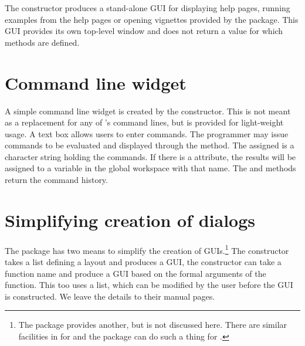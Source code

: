The  constructor produces a stand-alone
GUI for displaying help pages, running examples from the help pages or
opening vignettes provided by the package. This GUI provides its own
top-level window and does not return a value for which methods are defined.


\section{Command line widget}
\label{sec:gWidgets-command-line-widget}



A simple command line widget is created by the
 constructor. This is not meant as a
replacement for any of \R's command lines, but is provided for
light-weight usage. A text box allows users to enter \R\/
commands. The programmer may issue commands to be evaluated and
displayed through the  method. The
 assigned is a character string holding the commands. If
there is a  attribute, the results will be assigned to a variable
in the global workspace with that name. The  and \code{[}
methods return the command history.

\section{Simplifying creation of dialogs}
\label{sec:gWidgets-designing-forms}

The  package has two means to simplify the creation of
GUIs.\footnote{The  package provides another, but is not
  discussed here. There are similar facilities in  for
   and the  package can do such a thing for
  .}  The  constructor takes a list
defining a layout and produces a GUI, the 
constructor can take a function name and produce a GUI based on the
formal arguments of the function. This too uses a list, which can be
modified by the user before the GUI is constructed. We leave the
details to their manual pages.



